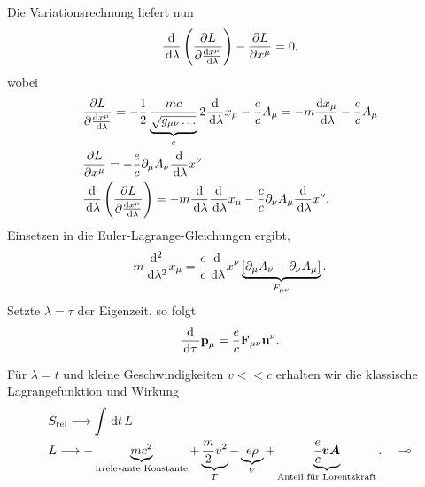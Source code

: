 Die Variationsrechnung liefert nun
\begin{align*}
\frac{\mathrm{d}}{\,\mathrm{d} \lambda}\left(\frac{\partial L}{\partial \frac{\mathrm{d}
x^\mu}{\,\mathrm{d} \lambda}}\right) - \frac{\partial L}{\partial x^\mu} = 0,
\end{align*}
wobei
\begin{align*}
&\frac{\partial L}{\partial \frac{\mathrm{d}
x^\mu}{\,\mathrm{d} \lambda}} = 
- 
\frac{1}{2}\underbrace{\frac{mc}{\sqrt{g_{\mu\nu}\ldots}}}_{c}2\frac{\mathrm{d}}{\,\mathrm{d} \lambda}x_\mu
- \frac{e}{c}A_\mu = - m\frac{\mathrm{d} x_\mu}{\,\mathrm{d} \lambda} - \frac{e}{c} A_\mu\\
&\frac{\partial L}{\partial x^\mu} = 
-\frac{e}{c}\partial_\mu A_\nu \frac{\mathrm{d}}{\,\mathrm{d} \lambda}x^\nu\\
&\frac{\mathrm{d}}{\,\mathrm{d} \lambda}\left(\frac{\partial L}{\partial \frac{\mathrm{d}
x^\mu}{\,\mathrm{d} \lambda}}\right) =
- m\frac{\mathrm{d}}{\,\mathrm{d} \lambda} \frac{\mathrm{d}}{\,\mathrm{d} \lambda} x_\mu -
\frac{c}{c}\partial_\nu A_\mu \frac{\mathrm{d}}{\,\mathrm{d} \lambda}x^\nu.
\end{align*}
Einsetzen in die Euler-Lagrange-Gleichungen ergibt,
\begin{align*}
m\frac{\mathrm{d}^2}{\,\mathrm{d} \lambda^2}x_\mu = \frac{e}{c}\frac{\mathrm{d}}{\,\mathrm{d} \lambda}x^\nu
\underbrace{\left[\partial_\mu A_\nu - \partial_\nu A_\mu\right]}_{F_{\mu\nu}}.
\end{align*}
Setzte $\lambda=\tau$ der Eigenzeit, so folgt
\begin{align*}
\frac{\mathrm{d}}{\,\mathrm{d} \tau\,} \bm{\mathrm{p}}_\mu = \frac{e}{c} \bm{\mathrm{F}}_{\mu\nu}\bm{\mathrm{u}}^\nu.
\end{align*}
\begin{bemn}
Für $\lambda=t$ und kleine Geschwindigkeiten $v<<c$ erhalten wir die klassische
Lagrangefunktion und Wirkung
\begin{align*}
&S_{\text{rel}} \longrightarrow \int\,\mathrm{d} t\, L\\
&L\longrightarrow - \underbrace{mc^2}_{\text{irrelevante Konstante}} +
\underbrace{\frac{m}{2}v^2}_{T} - \underbrace{e\rho}_{V} +
\underbrace{\frac{e}{c}\bm{v}\bm{A}}_{\text{Anteil für Lorentzkraft}}.\quad\multimap
\end{align*}
\end{bemn}